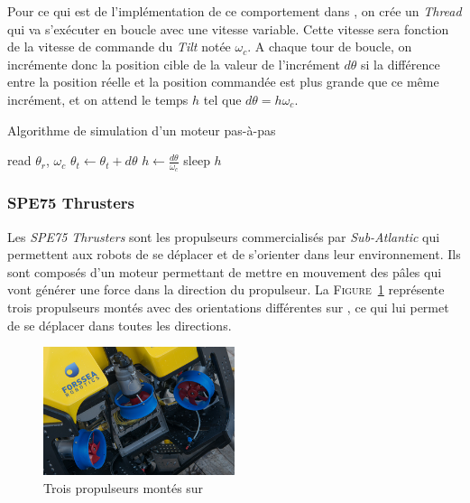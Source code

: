 				Pour ce qui est de l'implémentation de ce comportement dans \gazebo{}, on crée un \textit{Thread} qui va s'exécuter en boucle avec une vitesse variable. Cette vitesse sera fonction de la vitesse de commande du \textit{Tilt} notée $\omega_c$. A chaque tour de boucle, on incrémente donc la position cible de la valeur de l'incrément $d\theta$ si la différence entre la position réelle et la position commandée est plus grande que ce même incrément, et on attend le temps $h$ tel que $d\theta = h \omega_c$.

				\begin{algorithm}[!htb]
					\caption{Algorithme de simulation d'un moteur pas-à-pas}
					\label{algo:stepper_motor}
					\begin{algorithmic}
							\STATE read $\theta_r$, $\omega_c$
								\STATE $\theta_t \leftarrow \theta_t + d\theta$
							\ENDIF
							\STATE $h \leftarrow \frac{d\theta}{\omega_c}$
							\STATE sleep $h$
						\ENDWHILE
					\end{algorithmic}
				\end{algorithm}

			\subsubsection{SPE75 Thrusters}
		
				Les \textit{SPE75 Thrusters} sont les propulseurs commercialisés par \textit{Sub-Atlantic} qui permettent aux robots de se déplacer et de s'orienter dans leur environnement. Ils sont composés d'un moteur permettant de mettre en mouvement des pâles qui vont générer une force dans la direction du propulseur. La \textsc{Figure}~\ref{fig:thrusters} représente trois propulseurs montés avec des orientations différentes sur \atoll{}, ce qui lui permet de se déplacer dans toutes les directions.

				\begin{figure}[!htb]
					\centering
					\includegraphics[width=0.5\textwidth]{imgs/spe75_thrusters.png}
					\caption{Trois propulseurs montés sur \atoll{}}
					\label{fig:thrusters}
				\end{figure}

